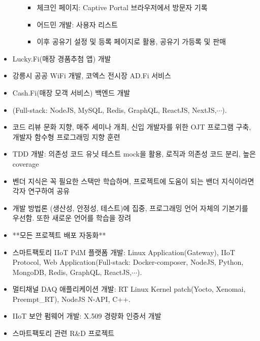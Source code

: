 \documentclass[10pt,a4paper,ragged2e]{altacv}
\begin{document}
\begin{fullwidth}
\begin{itemize}
\begin{itemize}[label=$\star$]
      \begin{itemize}
        \item 체크인 페이지: Captive Portal 브라우저에서 방문자 기록
        \item 어드민 개발: 사용자 리스트
        \item 이후 공유기 설정 및 등록 페이지로 활용, 공유기 가등록 및 판매
      \end{itemize}
    \end{itemize}
		\item Lucky.Fi(매장 경품추첨 앱) 개발
		\item 강릉시 공공 WiFi 개발, 코엑스 전시장 AD.Fi 서비스
		\item Cash.Fi(매장 모객 서비스) 백엔드 개발
		\item (Full-stack: NodeJS, MySQL, Redis, GraphQL, ReactJS, NextJS,$\cdots$).

		\item 코드 리뷰 문화 지향, 매주 세미나 개최, 신입 개발자를 위한 OJT 프로그램 구축, 개발자 함수형 프로그래밍 지향 훈련
		\item TDD 개발: 의존성 코드 유닛 테스트 mock을 활용, 로직과 의존성 코드 분리, 높은 coverage
		\item 벤더 지식은 꼭 필요한 스택만 학습하며, 프로젝트에 도움이 되는 밴더 지식이라면 각자 연구하여 공유
		\item 개발 방법론 (생산성, 안정성, 테스트)에 집중, 프로그래밍 언어 자체의 기본기를 우선함. 또한 새로운 언어를 학습을 장려
		\item **모든 프로젝트 배포 자동화**
	\end{itemize}

	\divider

	\begin{itemize}
		\item 스마트팩토리 IIoT PdM 플랫폼 개발: Linux Application(Gateway), IIoT Protocol, Web Application(Full-stack: Docker-composer, NodeJS, Python, MongoDB, Redis, GraphQL, ReactJS,$\cdots$).
		\item 멀티채널 DAQ 애플리케이션 개발: RT Linux Kernel patch(Yocto, Xenomai, Preempt\_RT), NodeJS N-API, C++.
		\item IIoT 보안 펌웨어 개발: X.509 경량화 인증서 개발
		\item 스마트팩토리 관련 R\&D 프로젝트
	\end{itemize}

	\divider


\end{fullwidth}
\end{document}
